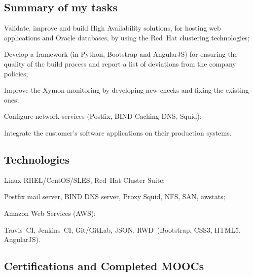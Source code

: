 \vskip -2mm
\subsection{Summary of my tasks}

\item{\bdot} Validate, improve and build High Availability solutions,
   for hosting web applications and Oracle databases, by using the Red~Hat clustering 
   technologies;
\item{\bdot} Develop a framework (in Python, Bootstrap and AngularJS) for ensuring
   the quality of the build process and report a list of deviations from the company policies;
\item{\bdot} Improve the Xymon monitoring by developing new checks and fixing the existing ones;
\item{\bdot} Configure network services (Postfix, BIND Caching DNS, Squid);
\item{\bdot} Integrate the customer's software applications on their production systems.

\vskip -2mm
\subsection{Technologies}

\item{\bdot} Linux RHEL/CentOS/SLES, Red~Hat Cluster Suite;
\item{\bdot} Postfix mail server, BIND DNS server, Proxy Squid, NFS, SAN, awstats;
\item{\bdot} Amazon Web Services (AWS);
\item{\bdot} Travis~CI, Jenkins~CI, Git/GitLab, JSON,
             RWD~(Bootstrap, CSS3, HTML5, AngularJS).

\subsection{Certifications and Completed MOOCs}

\bgroup\eightpoint
{}

\smallskip

